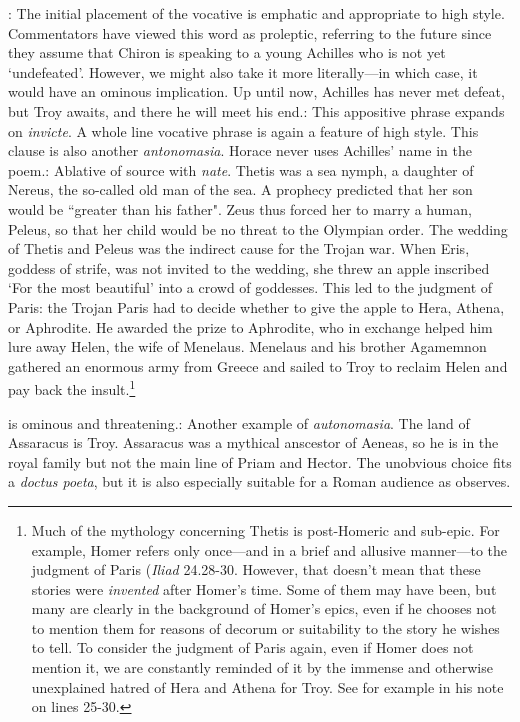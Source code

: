 
: The initial placement of the vocative is emphatic and
appropriate to high style.  Commentators have viewed this word as proleptic,
referring to the future since they assume that Chiron is speaking to a young
Achilles who is not yet `undefeated'.  However, we might also take it more
literally---in which case, it would have an ominous implication.  Up until now,
Achilles has never met defeat, but Troy awaits, and there he will meet his
end.\indent{}: This appositive phrase expands
on \textit{invicte}.  A whole line vocative phrase is again a feature of high
style.  This clause is also another \textit{antonomasia}.  Horace never
uses Achilles' name in the poem.\indent{}: Ablative of
source with \textit{nate}.  Thetis was a sea nymph, a daughter of Nereus, the
so-called old man of the sea.   A prophecy predicted that her son would be
``greater than his father".  Zeus thus forced her to marry a human, Peleus, so
that her child would be no threat to the Olympian order.  The wedding of Thetis
and Peleus was the indirect cause for the Trojan war.  When Eris, goddess of
strife, was not invited to the wedding, she threw an apple inscribed `For the
most beautiful' into a crowd of goddesses.  This led to the judgment of Paris:
the Trojan Paris had to decide whether to give the apple to Hera, Athena, or
Aphrodite.  He awarded the prize to Aphrodite, who in exchange helped him lure
away Helen, the wife of Menelaus.  Menelaus and his brother Agamemnon gathered
an enormous army from Greece and sailed to Troy to reclaim Helen and pay back
the insult.\footnote{Much of the mythology concerning Thetis is post-Homeric
and sub-epic.  For example, Homer refers only once---and in a brief and
allusive manner---to the judgment of Paris (\textit{Iliad} 24.28-30.  However,
that doesn't mean that these stories were \textit{invented} after Homer's time.
Some of them may have been, but many are clearly in the background of Homer's
epics, even if he chooses not to mention them for reasons of decorum or
suitability to the story he wishes to tell.  To consider the judgment of Paris
again, even if Homer does not mention it, we are constantly reminded of it by
the immense and otherwise unexplained hatred of Hera and Athena for Troy.  See
for example \citet[88]{macleod1982} in his note on lines 25-30.}


 is ominous and threatening.\indent{}: Another
example of \textit{autonomasia}.  The land of Assaracus is Troy. Assaracus was
a mythical anscestor of Aeneas, so he is in the royal family but not the main
line of Priam and Hector.  The unobvious choice fits a \textit{doctus poeta},
but it is also especially suitable for a Roman audience as
\citet[223]{mankin1995} observes.

